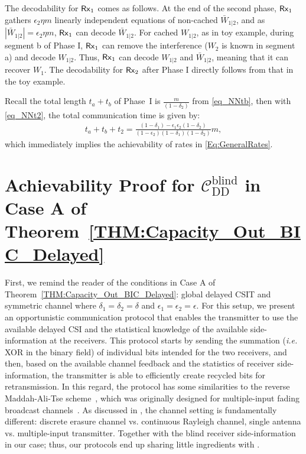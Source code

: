 \documentclass[journal,12pt,draftcls,onecolumn]{IEEEtran}
\begin{document}
The decodability for ${\sf Rx}_1$ comes as follows. At the end of the second phase, ${\sf Rx}_1$ gathers $\epsilon_2 \eta m$ linearly independent equations of non-cached $\bar{W}_{1|2}$, and as $\left| \bar{W}_{1|2} \right| = \epsilon_2 \eta m$, ${\sf Rx}_1$ can decode $\bar{W}_{1|2}$. For cached $W_{1|2}$, as in toy example, during segment b of Phase I, ${\sf Rx}_1$ can remove the interference ($W_2$ is known in segment a) and decode $W_{1|2}$. Thus, ${\sf Rx}_1$ can decode ${W}_{1|2}$ and $\bar{W}_{1|2}$, meaning that it can recover $W_1$. The decodability for ${\sf Rx}_2$ after Phase I  directly follows from that in the toy example.

 Recall the total length $t_a+t_b$ of Phase~I is $\frac{m}{(1-\delta_2)}$ from \eqref{eq_NNtb}, then with \eqref{eq_NNt2}, the total communication time is given by:
\begin{align}
t_a+t_b + t_2 =  \frac{(1-\delta_1)-\epsilon_1 \epsilon_2 (1-\delta_2)}{(1-\epsilon_2)(1-\delta_1)(1-\delta_2)}m,
\end{align}
which immediately implies the achievability of rates in \eqref{Eq:GeneralRates}.




\section{Achievability Proof for $\mathcal{C}^\mathrm{blind}_\mathrm{DD}$ in Case A of Theorem~\ref{THM:Capacity_Out_BIC_Delayed}}
\label{Section:Achievability_BIC_DDSymmetric}

First, we remind the reader of the conditions in Case A of Theorem~\ref{THM:Capacity_Out_BIC_Delayed}: global delayed CSIT and symmetric channel where $\delta_1 = \delta_2 = \delta$ and $\epsilon_1 = \epsilon_2 = \epsilon$. For this setup, we present an opportunistic communication protocol that enables the transmitter to use the available delayed CSI and the statistical knowledge of  the available side-information at the receivers. This protocol starts by sending the summation (\emph{i.e.} XOR in the binary field) of individual bits intended for the two receivers, and then, based on the available channel feedback and the statistics of receiver side-information, the transmitter is able to efficiently create recycled bits for retransmission. In this regard, the protocol has some similarities to the reverse Maddah-Ali-Tse scheme~\cite{yang2012degrees}, which was originally designed for multiple-input fading broadcast channels~\cite{maddah2012completely}. As discussed in \cite{sclin2018IT}, the channel setting is fundamentally different: discrete erasure channel vs. continuous Rayleigh channel, single antenna vs. multiple-input transmitter. Together with the blind receiver side-information in our case; thus, our protocols end up sharing little ingredients with \cite{yang2012degrees}.
\end{document}
